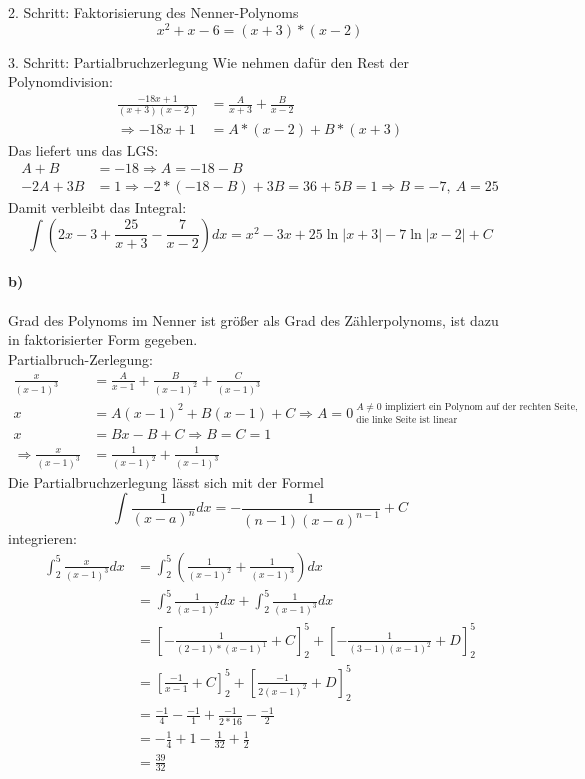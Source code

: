 \documentclass[10pt]{article}
\begin{document}
%
%
\par{2. Schritt:} Faktorisierung des Nenner-Polynoms
\[
	x^2 + x -6 = (x + 3) * (x - 2)
\]
\par{3. Schritt:} Partialbruchzerlegung
Wie nehmen dafür den Rest der Polynomdivision:
\begin{align*}
	\frac{-18x + 1}{(x+3)(x-2)} 
	&= \frac{A}{x+3} + \frac{B}{x-2} \\
	\Rightarrow
	-18x + 1 
	&= A * (x-2) + B * (x+3)
\end{align*}
Das liefert uns das LGS:
\begin{align*}
	A + B &= -18  
	\Rightarrow A = -18 - B
	\\
	-2A + 3B &= 1
	\Rightarrow -2 * (-18 - B) + 3B = 36 + 5B = 1 
	\Rightarrow B = -7, \ A = 25
\end{align*}
Damit verbleibt das Integral:
\[
	\int \left( 2x - 3 + \frac{25}{x+3} - \frac{7}{x-2} \right) dx
	=
	x^2 - 3x + 25 \ln\vert x+3 \vert
	- 7 \ln\vert x-2 \vert + C
\]

\vspace{0.5cm}
\paragraph{b)}
Grad des Polynoms im Nenner ist größer als Grad des Zählerpolynoms, ist dazu
in faktorisierter Form gegeben.\\
Partialbruch-Zerlegung:
\begin{align*}
	\frac{x}{(x-1)^3} 
	&= \frac{A}{x-1} + \frac{B}{(x-1)^2} + \frac{C}{(x-1)^3} \\
	x &= A (x-1)^2 + B (x-1) + C 
	\Rightarrow A = 0 \
	^\text{$A\neq0$ impliziert ein Polynom auf der 
	rechten Seite,}
	_\text{die linke Seite ist linear}\\
	x &= Bx - B + C 
	\Rightarrow B = C = 1\\
	\Rightarrow
	\frac{x}{(x-1)^3} &= \frac{1}{(x-1)^2} + \frac{1}{(x-1)^3}
\end{align*}
Die Partialbruchzerlegung lässt sich mit der Formel 
\[
	\int \frac{1}{(x-a)^n} dx 
	= - \frac{1}{(n-1)(x-a)^{n-1}} + C
\]
integrieren:
\begin{align*}
	\int_2^5 \frac{x}{(x-1)^3} dx
	&= \int_2^5 \left( \frac{1}{(x-1)^2} + \frac{1}{(x-1)^3} \right) dx
	\\
	&= \int_2^5 \frac{1}{(x-1)^2} dx 
	+ \int_2^5 \frac{1}{(x-1)^3} dx \\
	&= \left[ -\frac{1}{
		(2-1) * (x-1)^1
	} + C \right]_2^5
	+
	\left[ -\frac{1}{(3-1) (x-1)^2} + D \right]_2^5 \\
	&= \left[ \frac{-1}{x-1} + C \right]_2^5 +
	\left[ \frac{-1}{2 (x-1)^2} + D \right]_2^5 \\
	&= \frac{-1}{4} - \frac{-1}{1} + \frac{-1}{2 * 16} -
	\frac{-1}{2} \\
	&= -\frac14 + 1 - \frac1{32} + \frac12 \\
	&= \frac{39}{32}
\end{align*}
\end{document}
